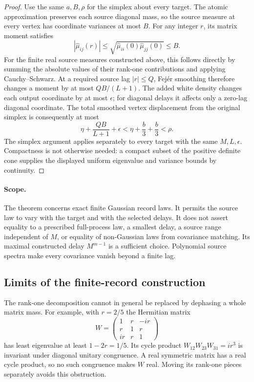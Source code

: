 \begin{proof}
Use the same $a,B,\rho$ for the simplex about every target. The atomic
approximation preserves each source diagonal mass, so the source
measure at every vertex has coordinate variances at most $B$. For any
integer $r$, its matrix moment satisfies
\[
 |\widehat\mu_{ij}(r)|\le
   \sqrt{\widehat\mu_{ii}(0)\widehat\mu_{jj}(0)}\le B.
\]
For the finite real source measures constructed above, this follows
directly by summing the absolute values of their rank-one contributions
and applying Cauchy--Schwarz. At a required source lag $|r|\le Q$,
Fej\'er smoothing therefore changes a moment by at most $QB/(L+1)$.
The added white density changes each output coordinate by at most
$\epsilon$; for diagonal delays it affects only a zero-lag diagonal
coordinate. The total smoothed vertex displacement from the original
simplex is consequently at most
\[
 \eta+\frac{QB}{L+1}+\epsilon
 <\eta+\frac b3+\frac b3<\rho.
\]
The simplex argument applies separately to every target with the same
$M,L,\epsilon$. Compactness is not otherwise needed: a compact subset
of the positive definite cone supplies the displayed uniform eigenvalue
and variance bounds by continuity.
\end{proof}

\paragraph{Scope.}
The theorem concerns exact finite Gaussian record laws. It permits the
source law to vary with the target and with the selected delays. It does
not assert equality to a prescribed full-process law, a smallest delay,
a source range independent of $M$, or equality of non-Gaussian laws
from covariance matching. Its maximal constructed delay $M^{m-1}$ is
a sufficient choice. Polynomial source spectra make every covariance vanish beyond a finite lag.

\subsection{Limits of the finite-record construction}
The rank-one decomposition cannot in general be replaced by dephasing
a whole matrix mass. For example, with $r=2/5$ the Hermitian matrix
\[
 W=\begin{pmatrix}1&r&-ir\\r&1&r\\ir&r&1\end{pmatrix}
\]
has least eigenvalue at least $1-2r=1/5$. Its cycle product
$W_{12}W_{23}W_{31}=ir^3$ is invariant under diagonal unitary
congruence. A real symmetric matrix has a real cycle product, so no
such congruence makes $W$ real. Moving its rank-one pieces separately
avoids this obstruction.

